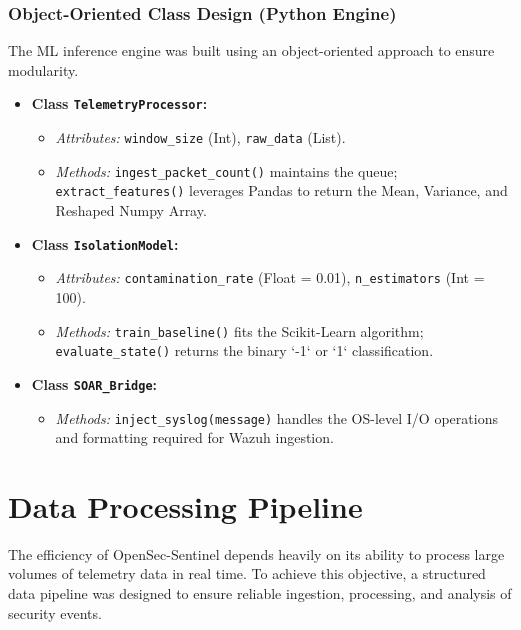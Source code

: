 \documentclass[12pt, a4paper]{report}
\begin{document}
	\subsection{Object-Oriented Class Design (Python Engine)}
	The ML inference engine was built using an object-oriented approach to ensure modularity. 
	
	\begin{itemize}
		\item \textbf{Class \texttt{TelemetryProcessor}:} 
		\begin{itemize}
			\item \textit{Attributes:} \texttt{window\_size} (Int), \texttt{raw\_data} (List).
			\item \textit{Methods:} \texttt{ingest\_packet\_count()} maintains the queue; \texttt{extract\_features()} leverages Pandas to return the Mean, Variance, and Reshaped Numpy Array.
		\end{itemize}
		\item \textbf{Class \texttt{IsolationModel}:}
		\begin{itemize}
			\item \textit{Attributes:} \texttt{contamination\_rate} (Float = 0.01), \texttt{n\_estimators} (Int = 100).
			\item \textit{Methods:} \texttt{train\_baseline()} fits the Scikit-Learn algorithm; \texttt{evaluate\_state()} returns the binary `-1` or `1` classification.
		\end{itemize}
		\item \textbf{Class \texttt{SOAR\_Bridge}:}
		\begin{itemize}
			\item \textit{Methods:} \texttt{inject\_syslog(message)} handles the OS-level I/O operations and formatting required for Wazuh ingestion.
		\end{itemize}
	\end{itemize}
	
	\chapter{Data Processing Pipeline}
	
	The efficiency of OpenSec-Sentinel depends heavily on its ability to process
	large volumes of telemetry data in real time. To achieve this objective, a
	structured data pipeline was designed to ensure reliable ingestion,
	processing, and analysis of security events.
	
\end{document}
